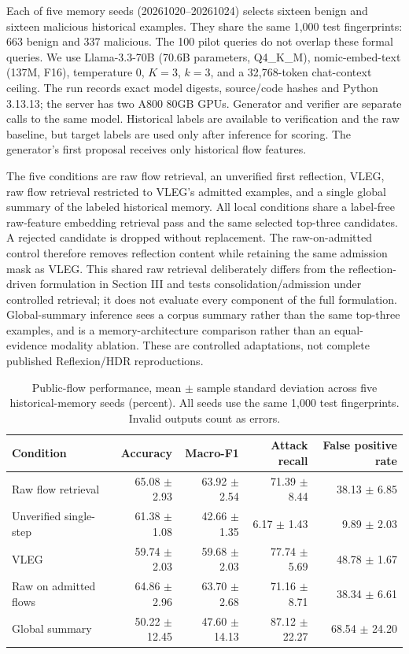 Each of five memory seeds (20261020--20261024) selects sixteen benign and sixteen malicious historical examples. They share the same 1,000 test fingerprints: 663 benign and 337 malicious. The 100 pilot queries do not overlap these formal queries. We use Llama-3.3-70B (70.6B parameters, Q4\_K\_M), nomic-embed-text (137M, F16), temperature $0$, $K=3$, $k=3$, and a 32,768-token chat-context ceiling. The run records exact model digests, source/code hashes and Python 3.13.13; the server has two A800 80GB GPUs. Generator and verifier are separate calls to the same model. Historical labels are available to verification and the raw baseline, but target labels are used only after inference for scoring. The generator's first proposal receives only historical flow features.

The five conditions are raw flow retrieval, an unverified first reflection, VLEG, raw flow retrieval restricted to VLEG's admitted examples, and a single global summary of the labeled historical memory. All local conditions share a label-free raw-feature embedding retrieval pass and the same selected top-three candidates. A rejected candidate is dropped without replacement. The raw-on-admitted control therefore removes reflection content while retaining the same admission mask as VLEG. This shared raw retrieval deliberately differs from the reflection-driven formulation in Section III and tests consolidation/admission under controlled retrieval; it does not evaluate every component of the full formulation. Global-summary inference sees a corpus summary rather than the same top-three examples, and is a memory-architecture comparison rather than an equal-evidence modality ablation. These are controlled adaptations, not complete published Reflexion/HDR reproductions.

\begin{table}[!t]
\centering
\caption{Public-flow performance, mean $\pm$ sample standard deviation across five historical-memory seeds (percent). All seeds use the same 1,000 test fingerprints. Invalid outputs count as errors.}
\label{tab:exp6_performance}
\small
\begin{tabular}{lrrrr}
\toprule
Condition & Accuracy & Macro-F1 & Attack recall & False positive rate \\
\midrule
Raw flow retrieval & 65.08 $\pm$ 2.93 & 63.92 $\pm$ 2.54 & 71.39 $\pm$ 8.44 & 38.13 $\pm$ 6.85 \\
Unverified single-step & 61.38 $\pm$ 1.08 & 42.66 $\pm$ 1.35 & 6.17 $\pm$ 1.43 & 9.89 $\pm$ 2.03 \\
VLEG & 59.74 $\pm$ 2.03 & 59.68 $\pm$ 2.03 & 77.74 $\pm$ 5.69 & 48.78 $\pm$ 1.67 \\
Raw on admitted flows & 64.86 $\pm$ 2.96 & 63.70 $\pm$ 2.68 & 71.16 $\pm$ 8.71 & 38.34 $\pm$ 6.61 \\
Global summary & 50.22 $\pm$ 12.45 & 47.60 $\pm$ 14.13 & 87.12 $\pm$ 22.27 & 68.54 $\pm$ 24.20 \\
\bottomrule
\end{tabular}
\end{table}

